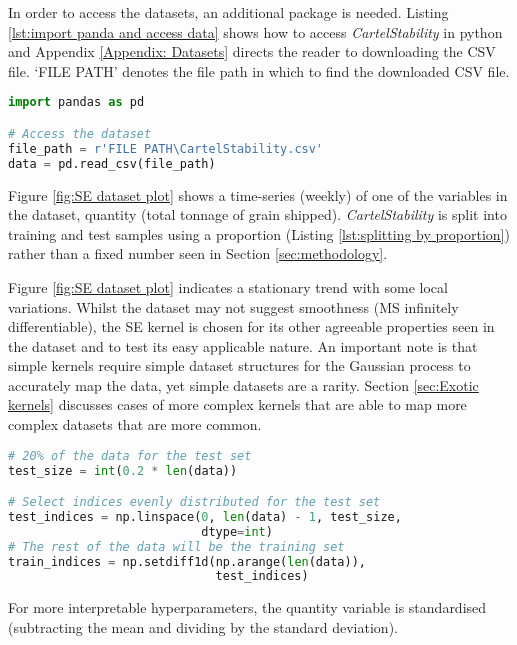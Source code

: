 \documentclass[12pt,a4paper]{article}
\begin{document}
In order to access the datasets, an additional package is needed. Listing \ref{lst:import panda and access data} shows how to access \textit{CartelStability} in python and Appendix \ref{Appendix: Datasets} directs the reader to downloading the CSV file. `FILE PATH' denotes the file path in which to find the downloaded CSV file.

\newpage
\begin{lstlisting}[language=python, caption={Code of importing the package `pandas' and accessing the data.}, label={lst:import panda and access data}]
import pandas as pd

# Access the dataset
file_path = r'FILE PATH\CartelStability.csv'
data = pd.read_csv(file_path)
\end{lstlisting}

Figure \ref{fig:SE dataset plot}  shows a time-series (weekly) of one of the variables in the dataset, quantity (total tonnage of grain shipped). \textit{CartelStability} is split into training and test samples using a proportion (Listing \ref{lst:splitting by proportion}) rather than a fixed number seen in Section \ref{sec:methodology}. 

Figure \ref{fig:SE dataset plot} indicates a stationary trend with some local variations. Whilst the dataset may not suggest smoothness (MS infinitely differentiable), the SE kernel is chosen for its other agreeable properties seen in the dataset and to test its easy applicable nature. An important note is that simple kernels require simple dataset structures for the Gaussian process to accurately map the data, yet simple datasets are a rarity. Section \ref{sec:Exotic kernels} discusses cases of more complex kernels that are able to map more complex datasets that are more common.

\vspace{20pt}
\begin{lstlisting}[language=python, caption={Code of producing test and training indices from a proportion of the data.}, label={lst:splitting by proportion}]
# 20% of the data for the test set
test_size = int(0.2 * len(data))  

# Select indices evenly distributed for the test set
test_indices = np.linspace(0, len(data) - 1, test_size,
                           dtype=int)
# The rest of the data will be the training set
train_indices = np.setdiff1d(np.arange(len(data)),
                             test_indices)
\end{lstlisting}

For more interpretable hyperparameters, the quantity variable is standardised (subtracting the mean and dividing by the standard deviation).
\end{document}
